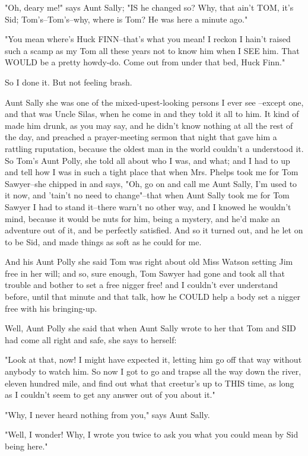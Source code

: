 "Oh, deary me!" says Aunt Sally; "IS he changed so?  Why, that ain't TOM,
it's Sid; Tom's--Tom's--why, where is Tom?  He was here a minute ago."

"You mean where's Huck FINN--that's what you mean!  I reckon I hain't
raised such a scamp as my Tom all these years not to know him when I SEE
him.  That WOULD be a pretty howdy-do.  Come out from under that bed,
Huck Finn."

So I done it.  But not feeling brash.

Aunt Sally she was one of the mixed-upest-looking persons I ever see
--except one, and that was Uncle Silas, when he come in and they told it
all to him.  It kind of made him drunk, as you may say, and he didn't
know nothing at all the rest of the day, and preached a prayer-meeting
sermon that night that gave him a rattling ruputation, because the oldest
man in the world couldn't a understood it.  So Tom's Aunt Polly, she told
all about who I was, and what; and I had to up and tell how I was in such
a tight place that when Mrs. Phelps took me for Tom Sawyer--she chipped
in and says, "Oh, go on and call me Aunt Sally, I'm used to it now, and
'tain't no need to change"--that when Aunt Sally took me for Tom Sawyer I
had to stand it--there warn't no other way, and I knowed he wouldn't
mind, because it would be nuts for him, being a mystery, and he'd make an
adventure out of it, and be perfectly satisfied.  And so it turned out,
and he let on to be Sid, and made things as soft as he could for me.

And his Aunt Polly she said Tom was right about old Miss Watson setting
Jim free in her will; and so, sure enough, Tom Sawyer had gone and took
all that trouble and bother to set a free nigger free! and I couldn't
ever understand before, until that minute and that talk, how he COULD
help a body set a nigger free with his bringing-up.

Well, Aunt Polly she said that when Aunt Sally wrote to her that Tom and
SID had come all right and safe, she says to herself:

"Look at that, now!  I might have expected it, letting him go off that
way without anybody to watch him.  So now I got to go and trapse all the
way down the river, eleven hundred mile, and find out what that creetur's
up to THIS time, as long as I couldn't seem to get any answer out of you
about it."

"Why, I never heard nothing from you," says Aunt Sally.

"Well, I wonder!  Why, I wrote you twice to ask you what you could mean
by Sid being here."

